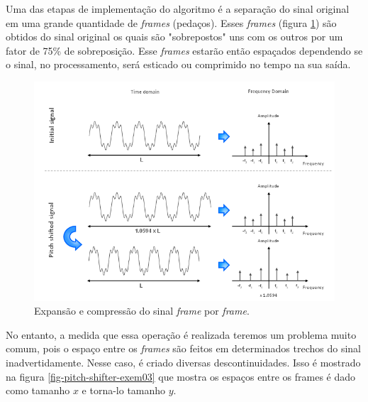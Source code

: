 				Uma das etapas de implementação do algoritmo é a separação do sinal original em uma grande quantidade de \textit{frames} (pedaços). Esses \textit{frames} (figura \ref{fig-pitch-shifter-exem02}) são obtidos do sinal original os quais são "sobrepostos" uns com os outros por um fator de 75\% de sobreposição. Esse \textit{frames} estarão então espaçados dependendo se o sinal, no processamento, será esticado ou comprimido no tempo na sua saída.
				
				\begin{figure}[!ht]
					\centering
					\includegraphics[scale=0.5]{./figuras/pitch-shifter-exem1.PNG}
					\caption{Expansão e compressão do sinal \textit{frame} por \textit{frame}.}
					\label{fig-pitch-shifter-exem02}
				\end{figure}
				
				No entanto, a medida que essa operação é realizada teremos um problema muito comum, pois o espaço entre os \textit{frames} são feitos em determinados trechos do sinal inadvertidamente. Nesse caso, é criado diversas descontinuidades. Isso é mostrado na figura \ref{fig-pitch-shifter-exem03} que mostra os espaços entre os frames é dado como tamanho $ x $ e torna-lo tamanho $ y $.
				
